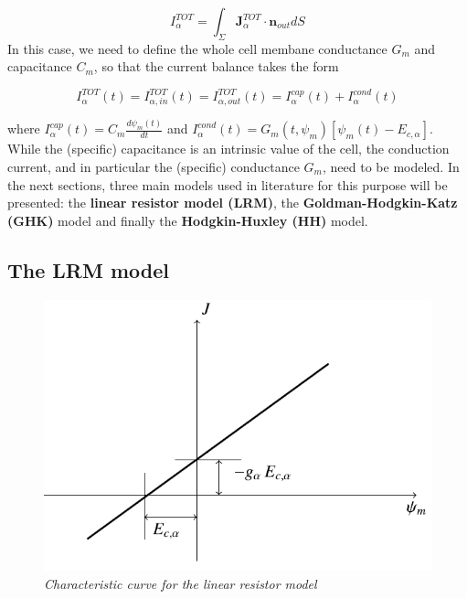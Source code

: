 \documentclass[a4paper]{article}
\begin{document}
	\begin{equation}
		I_{\alpha}^{TOT} = \int_{\Sigma} \textbf{J}_{\alpha}^{TOT} \cdot \textbf{n}_{out} dS 
	\end{equation} 
In this case, we need to define the whole cell membane conductance $ G_m$ and capacitance $ C_m $, so that the current balance takes the form

\begin{equation}
	I_{\alpha}^{TOT}(t) = I_{\alpha,in}^{TOT}(t) =I_{\alpha,out}^{TOT}(t) = I_{\alpha}^{cap}(t) + I_{\alpha}^{cond}(t)
\end{equation}
	
where $  I_{\alpha}^{cap}(t) = C_m \frac{d \psi_m(t)}{d t}$ and $ I_{\alpha}^{cond}(t) = G_m(t,\psi_m) [\psi_m(t) - E_{c,\alpha}]$.\\
While the (specific) capacitance is an intrinsic value of the cell, the conduction current, and  in particular the (specific) conductance $G_m$, need to be modeled. In the next sections, three main models used in literature for this purpose will be presented: the \textbf{linear resistor model (LRM)}, the \textbf{Goldman-Hodgkin-Katz (GHK)} model and finally the \textbf{Hodgkin-Huxley (HH)} model.\\


	
	
\subsection{The LRM model}

\begin{figure}[H]
	\begin{center}
		\includegraphics[scale=0.77]{LRM.png} 
	\end{center} 
	\caption{\textit{Characteristic curve for the linear resistor model}}
	
\end{figure}
\end{document}
